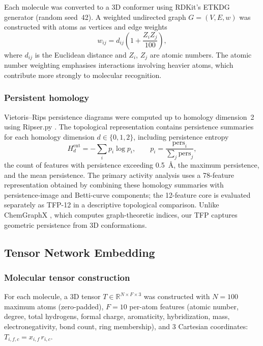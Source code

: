 \documentclass[11pt,a4paper]{article}
\begin{document}
Each molecule was converted to a 3D conformer using RDKit's ETKDG generator (random seed~42). A weighted undirected graph $G = (V, E, w)$ was constructed with atoms as vertices and edge weights
\begin{equation}
w_{ij} = d_{ij}\left(1 + \frac{Z_i Z_j}{100}\right),
\end{equation}
where $d_{ij}$ is the Euclidean distance and $Z_i$, $Z_j$ are atomic numbers. The atomic number weighting emphasises interactions involving heavier atoms, which contribute more strongly to molecular recognition.

\subsubsection{Persistent homology}

Vietoris--Rips persistence diagrams were computed up to homology dimension~2 using Ripser.py \citep{ripser_2019}. The topological representation contains persistence summaries for each homology dimension $d \in \{0, 1, 2\}$, including persistence entropy
\begin{equation}
H_d^{\mathrm{ent}} = -\sum_i p_i \log p_i, \qquad p_i = \frac{\mathrm{pers}_i}{\sum_j \mathrm{pers}_j},
\end{equation}
the count of features with persistence exceeding \SI{0.5}{\angstrom}, the maximum persistence, and the mean persistence. The primary activity analysis uses a 78-feature representation obtained by combining these homology summaries with persistence-image and Betti-curve components; the 12-feature core is evaluated separately as TFP-12 in a descriptive topological comparison. Unlike ChemGraphX \citep{chemgraphx_2026}, which computes graph-theoretic indices, our TFP captures geometric persistence from 3D conformations.

\subsection{Tensor Network Embedding}

\subsubsection{Molecular tensor construction}

For each molecule, a 3D tensor $T \in \mathbb{R}^{N \times F \times 3}$ was constructed with $N = 100$ maximum atoms (zero-padded), $F = 10$ per-atom features (atomic number, degree, total hydrogens, formal charge, aromaticity, hybridization, mass, electronegativity, bond count, ring membership), and 3 Cartesian coordinates: $T_{i,f,c} = x_{i,f} \, r_{i,c}$.
\end{document}
